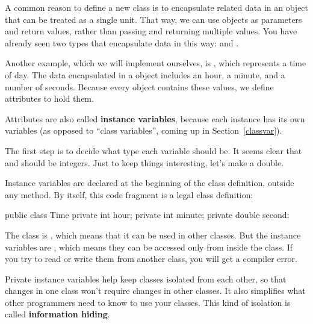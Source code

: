 
A common reason to define a new class is to encapsulate related data in an object that can be treated as a single unit.
That way, we can use objects as parameters and return values, rather than passing and returning multiple values.
You have already seen two types that encapsulate data in this way:  and .


Another example, which we will implement ourselves, is , which represents a time of day.
The data encapsulated in a  object includes an hour, a minute, and a number of seconds.
Because every  object contains these values, we define attributes to hold them.


Attributes are also called {\bf instance variables}, because each instance has its own variables (as opposed to ``class variables'', coming up in Section~\ref{classvar}).

The first step is to decide what type each variable should be.
It seems clear that  and  should be integers.
Just to keep things interesting, let's make  a double.

Instance variables are declared at the beginning of the class definition, outside any method.
By itself, this code fragment is a legal class definition:

\begin{code}
public class Time {
    private int hour;
    private int minute;
    private double second;
}
\end{code}


The  class is , which means that it can be used in other classes.
But the instance variables are , which means they can be accessed only from inside the  class.
If you try to read or write them from another class, you will get a compiler error.


Private instance variables help keep classes isolated from each other, so that changes in one class won't require changes in other classes.
It also simplifies what other programmers need to know to use your classes.
This kind of isolation is called {\bf information hiding}.


